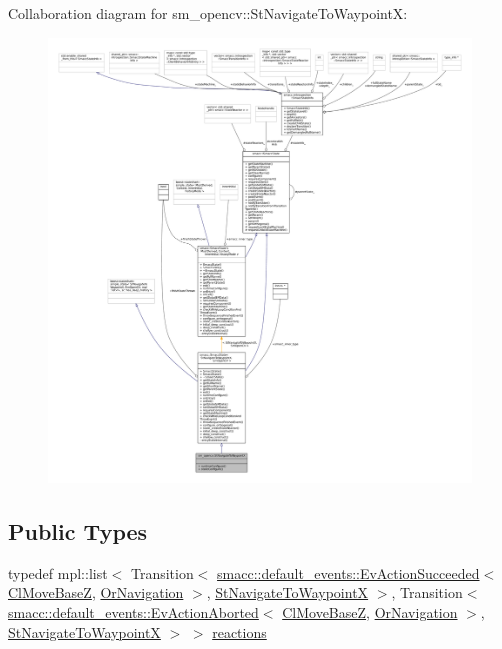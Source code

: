 Collaboration diagram for sm\+\_\+opencv\+:\+:St\+Navigate\+To\+WaypointX\+:
\nopagebreak
\begin{figure}[H]
\begin{center}
\leavevmode
\includegraphics[width=350pt]{structsm__opencv_1_1StNavigateToWaypointX__coll__graph}
\end{center}
\end{figure}
\subsection*{Public Types}
\begin{DoxyCompactItemize}
\item 
typedef mpl\+::list$<$ Transition$<$ \hyperlink{structsmacc_1_1default__events_1_1EvActionSucceeded}{smacc\+::default\+\_\+events\+::\+Ev\+Action\+Succeeded}$<$ \hyperlink{classcl__move__base__z_1_1ClMoveBaseZ}{Cl\+Move\+BaseZ}, \hyperlink{classsm__opencv_1_1OrNavigation}{Or\+Navigation} $>$, \hyperlink{structsm__opencv_1_1StNavigateToWaypointX}{St\+Navigate\+To\+WaypointX} $>$, Transition$<$ \hyperlink{structsmacc_1_1default__events_1_1EvActionAborted}{smacc\+::default\+\_\+events\+::\+Ev\+Action\+Aborted}$<$ \hyperlink{classcl__move__base__z_1_1ClMoveBaseZ}{Cl\+Move\+BaseZ}, \hyperlink{classsm__opencv_1_1OrNavigation}{Or\+Navigation} $>$, \hyperlink{structsm__opencv_1_1StNavigateToWaypointX}{St\+Navigate\+To\+WaypointX} $>$ $>$ \hyperlink{structsm__opencv_1_1StNavigateToWaypointX_a451d43b5b970f286d9f3d14ac1210a4c}{reactions}
\end{DoxyCompactItemize}
